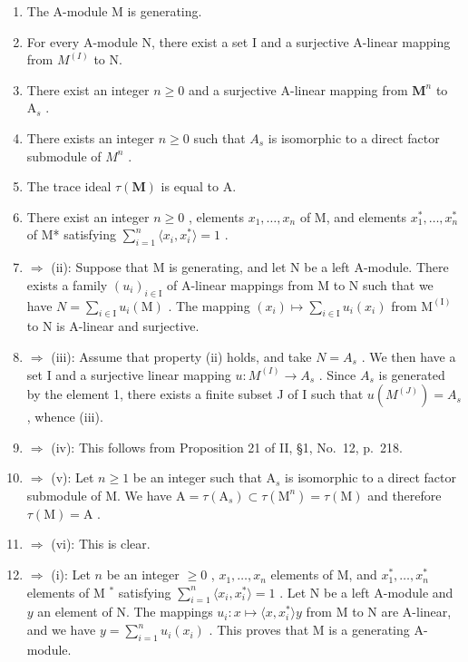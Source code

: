 \begin{enumerate}
\def\labelenumi{(\roman{enumi})}
\item
  The A-module M is generating.
\item
  For every A-module N, there exist a set I and a surjective A-linear mapping from \(M^{(I)}\) to N.
\item
  There exist an integer \(n \geqslant 0\) and a surjective A-linear mapping from \(\mathbf{M}^n\) to \(\mathrm{A}_s\) .
\item
  There exists an integer \(n \geqslant 0\) such that \(A_s\) is isomorphic to a direct factor submodule of \(M^n\) .
\item
  The trace ideal \(\tau (\mathbf{M})\) is equal to A.
\item
  There exist an integer \(n \geqslant 0\) , elements \(x_{1}, \ldots, x_{n}\) of M, and elements \(x_{1}^{*}, \ldots, x_{n}^{*}\) of M* satisfying \(\sum_{i=1}^{n} \langle x_{i}, x_{i}^{*} \rangle = 1\) .
\item
  \(\Rightarrow\) (ii): Suppose that M is generating, and let N be a left A-module. There exists a family \((u_{i})_{i\in\mathrm{I}}\) of A-linear mappings from M to N such that we have \(N=\sum_{i\in\mathrm{I}}u_{i}(\mathrm{M})\) . The mapping \((x_{i})\mapsto\sum_{i\in\mathrm{I}}u_{i}(x_{i})\) from \(\mathrm{M}^{(\mathrm{I})}\) to N is A-linear and surjective.
\item
  \(\Rightarrow\) (iii): Assume that property (ii) holds, and take \(N = A_s\) . We then have a set I and a surjective linear mapping \(u: M^{(I)} \to A_s\) . Since \(A_s\) is generated by the element 1, there exists a finite subset J of I such that \(u(M^{(J)}) = A_s\) , whence (iii).
\item
  \(\Rightarrow\) (iv): This follows from Proposition 21 of II, §1, No.~12, p.~218.
\item
  \(\Rightarrow\) (v): Let \(n \geqslant 1\) be an integer such that \(\mathrm{A}_s\) is isomorphic to a direct factor submodule of M. We have \(\mathrm{A} = \tau(\mathrm{A}_s) \subset \tau(\mathrm{M}^n) = \tau(\mathrm{M})\) and therefore \(\tau(\mathrm{M}) = \mathrm{A}\) .
\item
  \(\Rightarrow\) (vi): This is clear.
\item
  \(\Rightarrow\) (i): Let \(n\) be an integer \(\geqslant 0\) , \(x_{1},\ldots ,x_{n}\) elements of M, and \(x_{1}^{*},\ldots ,x_{n}^{*}\) elements of M \(^*\) satisfying \(\sum_{i = 1}^{n}\langle x_i,x_i^*\rangle = 1\) . Let N be a left A-module and \(y\) an element of N. The mappings \(u_{i}:x\mapsto \langle x,x_{i}^{*}\rangle y\) from M to N are A-linear, and we have \(y = \sum_{i = 1}^{n}u_{i}(x_{i})\) . This proves that M is a generating A-module.
\end{enumerate}

